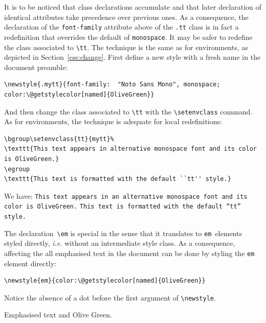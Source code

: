 It is to be noticed that class declarations accumulate and that later
declaration of identical attributes take precedence over previous
ones.  As a consequence, the declaration of the \verb+font-family+
attribute above of the \verb+.tt+ class is in fact a redefinition
that overrides the default of \verb+monospace+.
It may be safer to redefine the class associated to \verb+\tt+. The
technique is the same as for environments, as depicted in
Section~\ref{css:change}.
First define a new style with a fresh name in the document preamble:
\begin{verbatim}
\newstyle{.mytt}{font-family:  "Noto Sans Mono", monospace; color:\@getstylecolor[named]{OliveGreen}}
\end{verbatim}
And then change the class associated to \verb+\tt+ with
the \verb+\setenvclass+ command.
As for environments, the technique is adequate for local redefinitions:
\begin{verbatim}
\bgroup\setenvclass{tt}{mytt}%
\texttt{This text appears in alternative monospace font and its color is OliveGreen.}
\egroup
\texttt{This text is formatted with the default ``tt'' style.}
\end{verbatim}
\begin{htmlonly}
We have:
\bgroup
{}%
\texttt{This text appears in an alternative monospace font and its color is OliveGreen.}
\egroup\texttt{This text is formatted with the default ``tt'' style.}
\end{htmlonly}

The declaration~\verb+\em+ is special in the sense that it translates to
\verb+em+~elements styled directly, \emph{i.e.} without an intermediate style class. As a consequence, affecting the all emphasised text in the document can be done by styling the \verb+em+ element directly:
\begin{verbatim}
\newstyle{em}{color:\@getstylecolor[named]{OliveGreen}}
\end{verbatim}
Notice the absence of a dot before the first argument of \verb+\newstyle+.
\begin{htmlonly}
\begin{htmlout}
\def\em{}
\em Emphasised text and Olive Green.
\end{htmlout}
\end{htmlonly}

